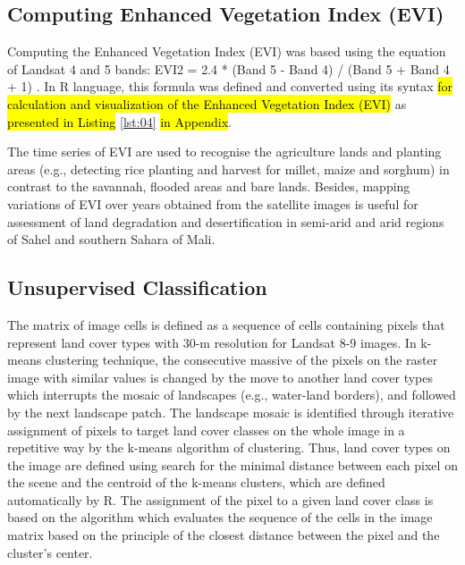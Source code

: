 \documentclass[12pt,a4paper,oneside]{article}
\def \newpar{\vspace{6pt}}
\begin{document}
\subsection*{Computing Enhanced Vegetation Index (EVI)}

\newpar Computing the Enhanced Vegetation Index (EVI) was based using the equation of Landsat 4 and 5 bands: EVI2 = 2.4 * (Band 5 - Band 4) / (Band 5 + Band 4 + 1) \citep{HUETE2002195}. In R language, this formula was defined and converted using its syntax \hl{for calculation and visualization of the Enhanced Vegetation Index (EVI)} as \hl{presented in Listing} \ref{lst:04} \hl{in Appendix}.

\newpar The time series of EVI are used to recognise the agriculture lands and planting areas (e.g., detecting rice planting and harvest for millet, maize and sorghum) in contrast to the savannah, flooded areas and bare lands. Besides, mapping variations of EVI over years obtained from the satellite images is useful for assessment of land degradation and desertification in semi-arid and arid regions of Sahel and southern Sahara of Mali. 

\subsection*{Unsupervised Classification}

\newpar The matrix of image cells is defined as a sequence of cells containing pixels that represent land cover types with 30-m resolution for Landsat 8-9 images. In k-means clustering technique, the consecutive massive of the pixels on the raster image with similar values is changed by the move to another land cover types which interrupts the mosaic of landscapes (e.g., water-land borders), and followed by the next landscape patch. The landscape mosaic is identified through iterative assignment of pixels to target land cover classes  on the whole image in a repetitive way by the k-means algorithm of clustering. Thus, land cover types on the image are defined using search for the minimal distance between each pixel on the scene and the centroid of the k-means clusters, which are defined automatically by R. The assignment of the pixel to a given land cover class is based on the algorithm which evaluates the sequence of the cells in the image matrix based on the principle of the closest distance between the pixel and the cluster's center.
\end{document}
